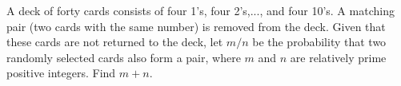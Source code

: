 A deck of forty cards consists of four 1's, four 2's,..., and four 10's.  A matching pair (two cards with the same number) is removed from the deck.  Given that these cards are not returned to the deck, let $m/n$ be the probability that two randomly selected cards also form a pair, where $m$ and $n$ are relatively prime positive integers.  Find $m+n.$